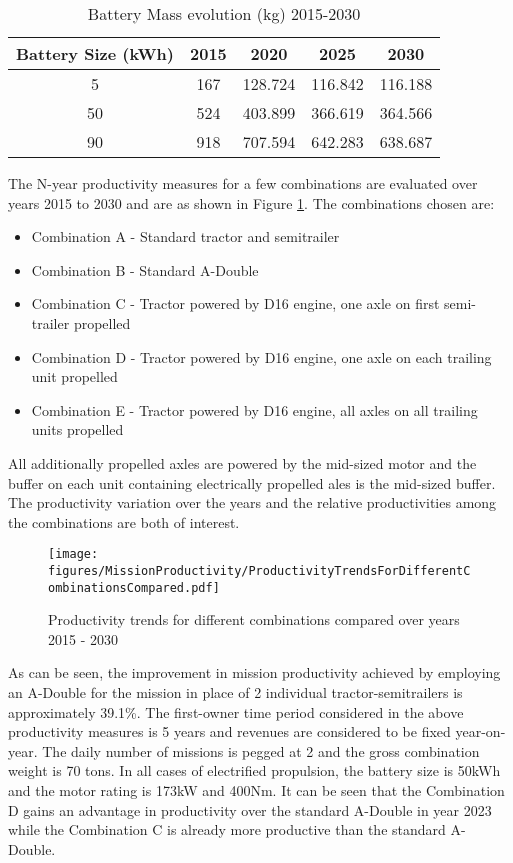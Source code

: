 \documentclass[ExampleMasters.tex]{subfiles}
\begin{document}
	\begin{table}[ht]
		\centering 
		\begin{tabular}{c c c c c}
			\hline
			Battery Size (kWh) & 2015 & 2020 & 2025 & 2030\\ 
			\hline
			5 & 167 & 128.724 & 116.842 & 116.188\\
			50 & 524 & 403.899 & 366.619 & 364.566\\
			90 & 918 & 707.594 & 642.283 & 638.687\\
			\hline 
		\end{tabular}
		\caption{Battery Mass evolution (kg) 2015-2030 \cite{ElementEnergy}} 
		\label{table:ParameterSensitivityBatteryMass} 
	\end{table}

	The N-year productivity measures for a few combinations are evaluated over years 2015 to 2030 and are as shown in Figure \ref{ProductivityComb20152030}. The combinations chosen are:

	\begin{itemize}
	\item Combination A - Standard tractor and semitrailer
	\item Combination B - Standard A-Double
	\item Combination C - Tractor powered by D16 engine, one axle on first semi-trailer propelled
	\item Combination D - Tractor powered by D16 engine, one axle on each trailing unit propelled
	\item Combination E - Tractor powered by D16 engine, all axles on all trailing units propelled
	\end{itemize}

	All additionally propelled axles are powered by the mid-sized motor and the buffer on each unit containing electrically propelled ales is the mid-sized buffer. The productivity variation over the years and the relative productivities among the combinations are both of interest.\\

	\begin{figure}[ht!]
		\centering
		\texttt{[image: figures/MissionProductivity/ProductivityTrendsForDifferentCombinationsCompared.pdf]}
		\caption{Productivity trends for different combinations compared over years 2015 - 2030}
		\label{ProductivityComb20152030}
	\end{figure}

	As can be seen, the improvement in mission productivity achieved by employing an A-Double for the mission in place of 2 individual tractor-semitrailers is approximately 39.1\%. The first-owner time period considered in the above productivity measures is 5 years and revenues are considered to be fixed year-on-year. The daily number of missions is pegged at 2 and the gross combination weight is 70 tons. In all cases of electrified propulsion, the battery size is 50kWh and the motor rating is 173kW and 400Nm. It can be seen that the Combination D gains an advantage in productivity over the standard A-Double in year 2023 while the Combination C is already more productive than the standard A-Double.\\
\end{document}
